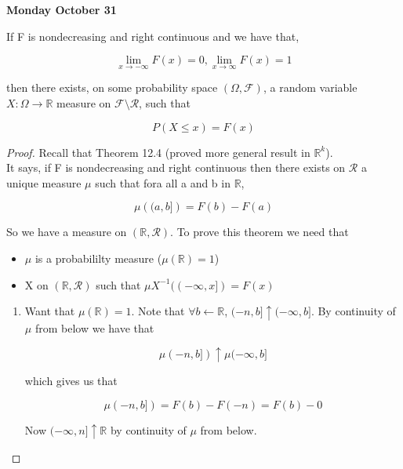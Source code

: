 \documentclass[11pt,fleqn]{book} %
\begin{document}
\textbf{Monday October 31}\\

\begin{theorem}
	If F is nondecreasing and right continuous and we have that, 

			$$\lim_{x \rightarrow - \infty} F(x) = 0, \lim_{x \rightarrow \infty} F(x) = 1 $$

	then there exists, on some probability space $(\Omega, \mathcal{F})$, a random variable $X: \Omega \rightarrow \mathbb{R}$ measure on $\mathcal{F}\setminus \mathcal{R}$, such that

			$$P(X \leq x) = F(x) $$

\end{theorem}


\begin{proof}
 Recall that Theorem 12.4 (proved more general result in $\mathbb{R}^k$).\\ It says, if F is nondecreasing and right continuous then there exists on $\mathcal{R}$ a unique measure $\mu$ such that fora all a and b in $\mathbb{R}$, 

 		$$\mu \left( (a, b] \right) = F(b) - F(a) $$


 So we have a measure on $(\mathbb{R}, \mathcal{R})$. To prove this theorem we need that 

 		\begin{itemize}
 			\item $\mu$ is a probabililty measure ($\mu(\mathbb{R}) = 1$) 
 			\item X on $(\mathbb{R}, \mathcal{R})$ such that $\mu X^{-1}((-\infty, x]) = F(x)$
 		\end{itemize}

 \begin{enumerate}
 	\item Want that $\mu(\mathbb{R}) = 1$. Note that $\forall b \leftarrow \mathbb{R}$, $(-n, b]  \uparrow (-\infty, b]$. By continuity of $\mu$ from below we have that

 			$$\mu(-n, b])  \uparrow \mu(-\infty, b] $$ 

 	which gives us that

 			$$\mu(-n, b]) = F(b) - F(-n) = F(b) - 0 $$

 	Now $(-\infty, n] \uparrow \mathbb{R}$ by continuity of $\mu$ from below. 

 \end{enumerate}
						
\end{proof}					
\end{document}
